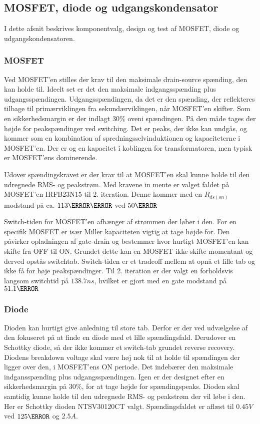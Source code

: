 \subsection{MOSFET, diode og udgangskondensator}
I dette afsnit beskrives komponentvalg, design og test af MOSFET, diode og udgangskondensatoren.

\subsubsection{MOSFET}
Ved MOSFET'en stilles der krav til den maksimale drain-source spænding, den kan holde til. Ideelt set er det den maksimale indgangsspænding plus udgangsspændingen. Udgangsspændingen, da det er den spænding, der reflekteres tilbage til primærviklingen fra sekundærviklingen, når MOSFET'en skifter. Som en sikkerhedsmargin er der indlagt $30\percent$ oveni spændingen. På den måde tages der højde for peakspændinger ved switching. Det er peaks, der ikke kan undgås, og kommer som en kombination af spredningsselvinduktionen og kapaciteterne i MOSFET'en. Der er og en kapacitet i koblingen for transformatoren, men typisk er MOSFET'ens dominerende. 


Udover spændingskravet er der krav til at MOSFET'en skal kunne holde til den udregnede RMS- og peakstrøm. Med kravene in mente er valget faldet på MOSFET'en IRFB23N15\cite{IRFB23N15} til 2. iteration. Denne kommer med en $R_{ds(on)}$ modstand på ca. $113\milli \ohm$ ved $50\degreeCelsius$

Switch-tiden for MOSFET'en afhænger af strømmen der løber i den. For en specifik MOSFET er især Miller kapaciteten vigtig at tage højde for. Den påvirker opladningen af gate-drain og bestemmer hvor hurtigt MOSFET'en kan skifte fra OFF til ON. Grundet dette kan en MOSFET ikke skifte momentant og derved opstås switchtab. Switch-tiden er et tradeoff mellem at opnå et lille tab og ikke få for høje peakspændinger. Til 2. iteration er der valgt en forholdsvis langsom switchtid på $138.7ns$, hvilket er gjort med en gate modstand på $51.1\ohm$


\subsubsection{Diode}
Dioden kan hurtigt give anledning til store tab. Derfor er der ved udvælgelse af den fokuseret på at finde en diode med et lille spændingsfald. Derudover en Schottky diode, så der ikke kommer et switch-tab grundet reverse recovery. Diodens breakdown voltage skal være høj nok til at holde til spændingen der ligger over den, i MOSFET'ens ON periode. Det indebærer den maksimale indgansspænding plus udgangsspændingen. Igen er der designet efter en sikkerhedsmargin på $30\percent$, for at tage højde for spændingspeaks. Dioden skal samtidig kunne holde til den udregnede RMS- og peakstrøm der vil løbe i den. Her er Schottky dioden NTSV30120CT\cite{NTSV30120} valgt. Spændingsfaldet er aflæst til $0.45V$ ved $125\degreeCelsius$ og $2.5A$.  

